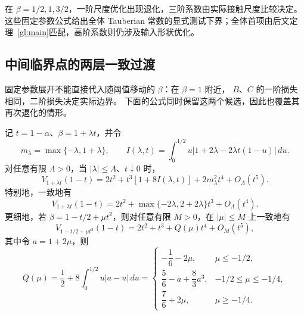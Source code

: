 \begin{remark}
在 $\beta=1/2,1,3/2$，一阶尺度优化出现退化，三阶系数由实际接触尺度比较决定。
这些固定参数公式给出全体 Tauberian 常数的显式测试下界；全体首项由后文定理~\ref{gl:main}匹配，高阶系数则仍涉及输入形状优化。
\end{remark}

\subsection{中间临界点的两层一致过渡}

固定参数展开不能直接代入随阈值移动的 $\beta$：在 $\beta=1$ 附近，
$B$、$C$ 的一阶损失相同，二阶损失决定实际边界。
下面的公式同时保留这两个候选，因此也覆盖其再次退化的情形。

\begin{theorem}[中间临界点的一致四阶公式]\label{fix:critical-uniform}
记 $t=1-\alpha$、$\beta=1+\lambda t$，并令
\[
 m_\lambda=\max\{-\lambda,1+\lambda\},\qquad
 I(\lambda,t)=\int_0^{1/2}u
 \left|1+2\lambda-2\lambda t(1-u)\right|\,du.
\]
对任意有限 $\Lambda>0$，当 $|\lambda|\le\Lambda$、$t\downarrow0$ 时，
\begin{equation}\label{fix:composite-fourth}
 V_{1+\lambda t}(1-t)
 =2t^2+t^3[1+8I(\lambda,t)]
       +2m_\lambda^2t^4+O_\Lambda(t^5).
\end{equation}
特别地，一致地有
\begin{equation}\label{fix:outer-critical}
 V_{1+\lambda t}(1-t)
 =2t^2+\max\{-2\lambda,2+2\lambda\}t^3+O_\Lambda(t^4).
\end{equation}
更细地，若 $\beta=1-t/2+\mu t^2$，则对任意有限 $M>0$，在 $|\mu|\le M$ 上一致地有
\begin{equation}\label{fix:inner-critical}
 V_{1-t/2+\mu t^2}(1-t)=2t^2+t^3+Q(\mu)t^4+O_M(t^5),
\end{equation}
其中令 $a=1+2\mu$，则
\begin{equation}\label{fix:inner-coefficient}
 Q(\mu)=\frac12+8\int_0^{1/2}u|a-u|\,du
 =\begin{cases}
 -\dfrac16-2\mu,&\mu\le-1/2,\\[3pt]
 \dfrac56-a+\dfrac83a^3,&-1/2\le\mu\le-1/4,\\[3pt]
 \dfrac76+2\mu,&\mu\ge-1/4.
 \end{cases}
\end{equation}
\end{theorem}
